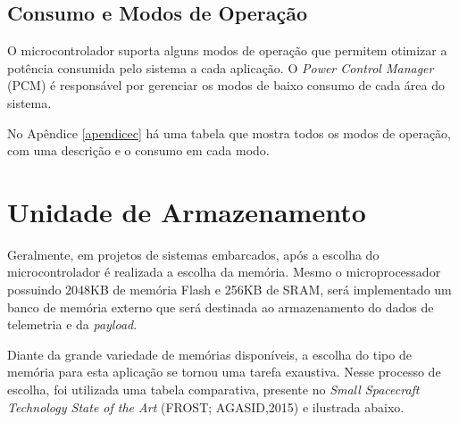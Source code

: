 \subsection{Consumo e Modos de Operação}

O microcontrolador suporta alguns modos de operação que permitem otimizar a potência consumida pelo sistema a cada aplicação. O \textit{Power Control Manager} (PCM) é responsável por gerenciar os modos de baixo consumo de cada área do sistema. 

No Apêndice \ref{apendicec} há uma tabela que mostra todos os modos de operação, com uma descrição e o consumo em cada modo.

\section{Unidade de Armazenamento}

Geralmente, em projetos de sistemas embarcados, após a escolha do microcontrolador é realizada a escolha da memória. Mesmo o microprocessador possuindo 2048KB de memória Flash e 256KB de SRAM, será implementado um banco de memória externo que será destinada ao armazenamento do dados de telemetria e da \textit{payload}.

Diante da grande variedade de memórias disponíveis, a escolha do tipo de memória para esta aplicação se tornou uma tarefa exaustiva. Nesse processo de escolha, foi utilizada uma tabela comparativa, presente no \textit{Small Spacecraft Technology State of the Art} (FROST; AGASID,2015) e ilustrada abaixo.


